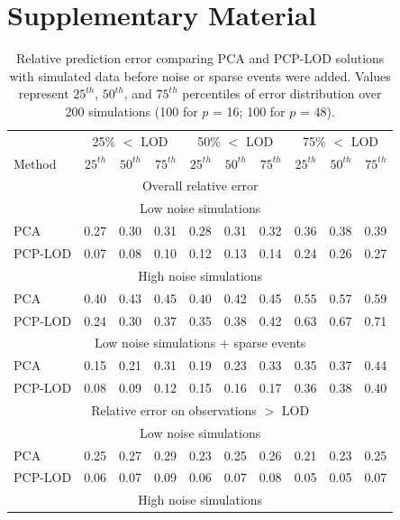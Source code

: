 {\section{Supplementary Material}
\label{sec2supp}
\begingroup
\renewcommand{\arraystretch}{1.05}
\begin{table}[!h]
\centering
\caption{Relative prediction error comparing PCA and PCP-LOD solutions with simulated data before noise or sparse events were added. Values represent $25^{th}$, $50^{th}$, and $75^{th}$ percentiles of error distribution over 200 simulations (100 for $p$ = 16; 100 for $p$ = 48).}
\label{table:supp}
\begin{tabular}{lrrr|rrr|rrr}
  \hline
  \hline
 & \multicolumn{3}{c}{25\% $<$ LOD} & \multicolumn{3}{c}{50\% $<$ LOD} & \multicolumn{3}{c}{75\% $<$ LOD} \\ 
Method & $25^{th}$ & $50^{th}$ & $75^{th}$ & $25^{th}$ & $50^{th}$ & $75^{th}$ & $25^{th}$ & $50^{th}$ & $75^{th}$ \\
\hline
\multicolumn{10}{c}{Overall relative error} \\
\hline
\multicolumn{10}{c}{Low noise simulations} \\
\hline
PCA & 0.27 & 0.30 & 0.31 & 0.28 & 0.31 & 0.32 & 0.36 & 0.38 & 0.39 \\ 
PCP-LOD & 0.07 & 0.08 & 0.10 & 0.12 & 0.13 & 0.14 & 0.24 & 0.26 & 0.27 \\ 
\hline  
\multicolumn{10}{c}{High noise simulations} \\
\hline
PCA & 0.40 & 0.43 & 0.45 & 0.40 & 0.42 & 0.45 & 0.55 & 0.57 & 0.59 \\ 
PCP-LOD & 0.24 & 0.30 & 0.37 & 0.35 & 0.38 & 0.42 & 0.63 & 0.67 & 0.71 \\ 
\hline  
\multicolumn{10}{c}{Low noise simulations + sparse events} \\
\hline
PCA & 0.15 & 0.21 & 0.31 & 0.19 & 0.23 & 0.33 & 0.35 & 0.37 & 0.44 \\ 
PCP-LOD & 0.08 & 0.09 & 0.12 & 0.15 & 0.16 & 0.17 & 0.36 & 0.38 & 0.40 \\ 
\hline  
\multicolumn{10}{c}{Relative error on observations $>$ LOD} \\
\hline
\multicolumn{10}{c}{Low noise simulations} \\
\hline
PCA & 0.25 & 0.27 & 0.29 & 0.23 & 0.25 & 0.26 & 0.21 & 0.23 & 0.25 \\ 
PCP-LOD & 0.06 & 0.07 & 0.09 & 0.06 & 0.07 & 0.08 & 0.05 & 0.05 & 0.07 \\ 
\hline  
\multicolumn{10}{c}{High noise simulations} \\

\end{tabular}
\end{table}}
